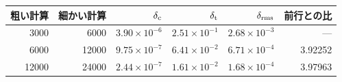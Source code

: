 \begin{tabular}{rrrrrr}\toprule
粗い計算 & 細かい計算 & $\delta_{\rm c}$ & $\delta_{\rm t}$ & $\delta_{\rm rms}$ & 前行との比 \\
\midrule
3000 & 6000 & $3.90\times 10^{-6}$ & $2.51\times 10^{-1}$ & $2.68\times 10^{-3}$ & --- \\
6000 & 12000 & $9.75\times 10^{-7}$ & $6.41\times 10^{-2}$ & $6.71\times 10^{-4}$ & 3.92252 \\
12000 & 24000 & $2.44\times 10^{-7}$ & $1.61\times 10^{-2}$ & $1.68\times 10^{-4}$ & 3.97963 \\
\bottomrule\end{tabular}
